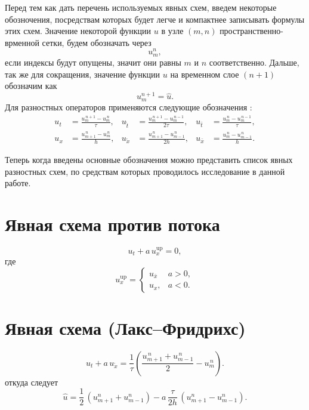 \documentclass[a4paper,14pt]{extreport}
\begin{document}
Перед тем как дать перечень используемых явных схем, введем некоторые обозночения, посредствам которых будет легче и компактнее записывать формулы этих схем. Значение некоторой функции $u$ в узле $(m,n)$ пространственно-врменной сетки, будем обозначать через 
\[
u_m^n,
\]если индексы будут опущены, значит они равны $m$ и $n$ соответственно. Дальше, так же для сокращения, значение функции $u$ на временном слое $(n+1)$ обозначим как
\[
u_m^{n+1} = \hat{u}.
\]
Для разностных операторов применяются следующие обозначения \cite{popov}:
\begin{align}
u_t &= \frac{u_m^{\,n+1} - u_m^{\,n}}{\tau}, &
u_{\mathring{t}} &= \frac{u_m^{\,n+1} - u_m^{\,n-1}}{2\tau}, &
u_{\bar{t}} &= \frac{u_m^{\,n} - u_m^{\,n-1}}{\tau}, 
\label{form:oboz1}\\
u_x &= \frac{u_{m+1}^{\,n} - u_m^{\,n}}{h}, &
u_{\mathring{x}} &= \frac{u_{m+1}^{\,n} - u_{m-1}^{\,n}}{2h}, &
u_{\bar{x}} &= \frac{u_m^{\,n} - u_{m-1}^{\,n}}{h}.
\label{form:oboz2}
\end{align}

Теперь когда введены основные обозначения можно представить список явных разностных схем, по средствам которых проводилось исследование в данной работе.

\section*{Явная схема против потока}
\begin{equation}
u_t + a\,u_x^{\mathrm{up}} = 0,    
\end{equation}
где
\[
u_x^{\mathrm{up}} =
\begin{cases}
u_{\bar{x}} & a > 0, \\
u_x,      & a < 0.
\end{cases}
\]

\section*{Явная схема (Лакс–Фридрихс)}
\begin{equation}
    u_t
    +
    a\,u_{\mathring{x}}
    =
    \frac{1}{\tau}
    \left(
    \frac{u_{m+1}^{\,n}+u_{m-1}^{\,n}}{2}
    -
    u_m^{\,n}
    \right).
\end{equation}
откуда следует
\begin{equation*}
    \hat{u} = \frac{1}{2}\,\left(
        u_{m+1}^n + u_{m-1}^n \right) -
        a\,\frac{\tau}{2h}\,\left(
        u_{m+1}^n - u_{m-1}^n \right).
\end{equation*}
\end{document}
